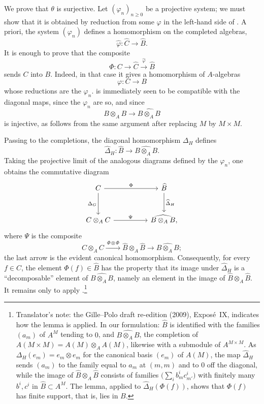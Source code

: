 We prove that \(\theta\) is surjective. Let
\((\varphi_n)_{n\geq0}\) be a projective system; we must show that it is
obtained by reduction from some \(\varphi\) in the left-hand side of
. A priori, the system \((\varphi_n)\) defines a homomorphism
on the completed algebras,
\[
  \widehat\varphi:\widehat C\longrightarrow\widehat B.
\]
It is enough to prove that the composite
\[
  \Phi:
  C\longrightarrow\widehat C
   \xrightarrow{\widehat\varphi}\widehat B
\]
sends \(C\) into \(B\). Indeed, in that case it gives a homomorphism of
\(A\)-algebras
\[
  \varphi:C\longrightarrow B
\]
whose reductions are the \(\varphi_n\).  is immediately
seen to be compatible with the diagonal maps, since the \(\varphi_n\)
are so, and since
\[
  B\otimes_AB\longrightarrow\widehat{B\otimes_AB}
\]
is injective, as follows from the same argument after replacing \(M\)
by \(M\times M\).

Passing to the completions, the diagonal homomorphism \(\Delta_H\)
defines
\[
  \widehat\Delta_H:
  \widehat B\longrightarrow\widehat{B\otimes_AB}.
\]
Taking the projective limit of the analogous diagrams defined by the
\(\varphi_n\), one obtains the commutative diagram
\[
\begin{tikzcd}[column sep=huge,row sep=large]
  C
    \arrow[r,"\Phi"]
    \arrow[d,"\Delta_G"']
  & \widehat B
    \arrow[d,"\widehat\Delta_H"]
  \\
  C\otimes_A C
    \arrow[r,"\Psi"]
  & \widehat{B\otimes_A B},
\end{tikzcd}
\]
where \(\Psi\) is the composite
\[
  C\otimes_A C
  \xrightarrow{\ \Phi\otimes\Phi\ }
  \widehat B\otimes_A\widehat B
  \longrightarrow
  \widehat{B\otimes_A B};
\]
the last arrow is the evident canonical homomorphism. Consequently, for
every \(f\in C\), the element \(\Phi(f)\in\widehat B\) has the property
that its image under \(\widehat\Delta_H\) is a ``decomposable'' element
of \(\widehat{B\otimes_A B}\), namely an element in the image of
\(\widehat B\otimes_A\widehat B\). It remains only to apply
.\footnote{Translator's note:
the Gille--Polo draft re-edition (2009), Expos\'e~IX, indicates how the lemma
is applied. In our formulation: \(\widehat B\) is identified with the
families \((a_m)\) of \(A^M\) tending to \(0\), and
\(\widehat{B\otimes_AB}\), the completion of
\(A(M\times M)=A(M)\otimes_AA(M)\), likewise with a submodule of
\(A^{M\times M}\). As \(\Delta_H(e_m)=e_m\otimes e_m\) for the canonical
basis \((e_m)\) of \(A(M)\), the map \(\widehat\Delta_H\) sends \((a_m)\) to
the family equal to \(a_m\) at \((m,m)\) and to \(0\) off the diagonal,
while the image of \(\widehat B\otimes_A\widehat B\) consists of families
\(\bigl(\sum_ib^i_mc^i_{m'}\bigr)\) with finitely many \(b^i,c^i\) in
\(\widehat B\subset A^M\). The lemma, applied to
\(\widehat\Delta_H(\Phi(f))\), shows that \(\Phi(f)\) has finite support,
that is, lies in \(B\).}

